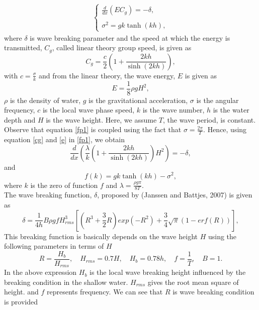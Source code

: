 \begin{eqnarray}
\label{fp1}
\left \{
\begin{array}{lll}
\frac{d}{dx}\left(EC_g\right)=-\delta,\\
\\
\sigma^2=gk\tanh(kh),
\label{ode}
\end{array}
\right.
\end{eqnarray}
where $\delta$ is  wave breaking parameter and the speed at which the energy is transmitted, $C_g$, called linear theory group speed, is given as
\begin{equation}
\label{cg}
C_g=\frac{c}{2}\left(1+\frac{2kh}{\sinh(2kh)}\right),
\end{equation}
with $c=\frac{\sigma}{k}$ and from the linear theory, the wave energy, $E$ is given as
\begin{equation}
\label{e}
E=\frac{1}{8}\rho g H^2,
\end{equation}
$\rho$ is the density of water, $g$ is the gravitational acceleration, $\sigma$ is the angular frequency, $c$ is the local wave phase speed, $k$ is the wave number, $h$ is the water depth and $H$ is the wave height. Here, we assume $T$, the wave period, is constant.\\ 

\noindent Observe that equation \ref{fp1} is coupled using the fact that $\sigma=\frac{2\pi}{T}$. Hence, using equation \ref{cg} and \ref{e} in \ref{fp1}, we obtain
\begin{equation}
\label{fpdelta}
\frac{d}{dx}\left( \frac{\lambda}{k}\left(1+\frac{2kh}{\sinh(2kh)}\right)H^2 \right)=-\delta,
\end{equation}  
and 
\begin{equation}
\label{fk}
f(k) = gk\tanh(kh)-\sigma^2,
\end{equation}
where $k$ is the zero of function $f$ and $\lambda=\frac{\rho g \pi}{8T}$.\\

The wave breaking function, $\delta$, proposed by (Janssen and Battjes, 2007) is given as
\begin{equation}
\delta = \frac{1}{4h}B\rho g f H_{rms}^3\left[(R^3+\frac{3}{2}R)exp(-R^2)+\frac{3}{4}\sqrt{\pi}(1-erf(R))\right],
\end{equation}
This breaking function is basically depends on the wave height ${H}$ using the following parameters in terms of ${H}$\\
$$R=\frac{H_b}{H_{rms}}, \quad H_{rms} = 0.7H,\quad H_b=0.78h,\quad f=\frac{1}{T},\quad B=1.$$
In the above expression ${H_{b}}$ is the local wave breaking height influenced by the breaking condition in the shallow water. ${H_{rms}}$ gives the root mean square of height. and ${f}$ represents frequency. We can see that ${R}$ is wave breaking condition is provided 

